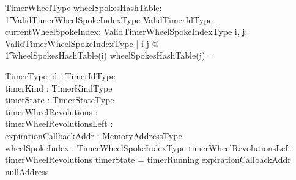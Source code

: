 \documentclass[11pt,letterpaper,twoside,openany]{book}
\begin{document}
\begin{schema}{TimerWheelType}
   wheelSpokesHashTable: \\
   \t1 ValidTimerWheelSpokeIndexType \fun \finset ValidTimerIdType \\
   currentWheelSpokeIndex: ValidTimerWheelSpokeIndexType
\where
    \forall i, j: ValidTimerWheelSpokeIndexType | i \neq j @ \\
    \t1 wheelSpokesHashTable(i) \cap wheelSpokesHashTable(j) = \emptyset
\end{schema}

\begin{schema}{TimerType}
   id : TimerIdType \\
   timerKind : TimerKindType \\
   timerState : TimerStateType \\
   timerWheelRevolutions : \nat \\
   timerWheelRevolutionsLeft : \nat \\
   expirationCallbackAddr : MemoryAddressType \\
   wheelSpokeIndex : TimerWheelSpokeIndexType
\where
   timerWheelRevolutionsLeft \leq timerWheelRevolutions
\also
   timerState = timerRunning \implies expirationCallbackAddr \neq nullAddress
\end{schema}
\end{document}
